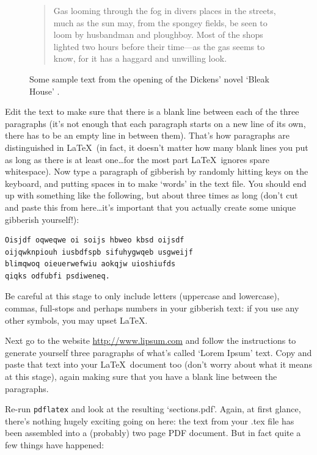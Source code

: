 \begin{refsection}
\begin{figure}[tbp]
\begin{quote}
Gas looming through the fog in divers places in the streets, much as
the sun may, from the spongey fields, be seen to loom by husbandman
and ploughboy. Most of the shops lighted two hours before their
time---as the gas seems to know, for it has a haggard and unwilling
look.

\end{quote}

\caption{Some sample text from the opening of the Dickens' novel `Bleak House' \citep{dickens1852}.}\label{figure:bleakhouse}
\end{figure}

Edit the text to make sure that there is a blank line between each of the three paragraphs (it's not enough that each paragraph starts on a new line of its own, there has to be an empty line in between them). That's how paragraphs are distinguished in \LaTeX\ (in fact, it doesn't matter how many blank lines you put as long as there is at least one\ldots for the most part \LaTeX\ ignores spare whitespace). Now type a paragraph of gibberish by randomly hitting keys on the keyboard, and putting spaces in to make `words' in the text file. You should end up with something like the following, but about three times as long (don't cut and paste this from here\ldots it's important that you actually create some unique gibberish yourself!):

\begin{verbatim}
Oisjdf oqweqwe oi soijs hbweo kbsd oijsdf 
oijqwknpiouh iusbdfspb sifuhygwqeb usgweijf 
blimqwoq oieuerwefwiu aokqjw uioshiufds 
qiqks odfubfi psdiweneq.
\end{verbatim}

Be careful at this stage to only include letters (uppercase and lowercase), commas, full-stops and perhaps numbers in your gibberish text: if you use any other symbols, you may upset \LaTeX. 

Next go to the website \href{http://www.lipsum.com/}{http://www.lipsum.com} and follow the instructions to generate yourself three paragraphs of what's called `Lorem Ipsum' text. Copy and paste that text into your \LaTeX\ document too (don't worry about what it means at this stage), again making sure that you have a blank line between the paragraphs.

Re-run \texttt{pdflatex} and look at the resulting `sections.pdf'. Again, at first glance, there's nothing hugely exciting going on here: the text from your .tex file has been assembled into a (probably) two page PDF document. But in fact quite a few things have happened: 


\end{refsection}
